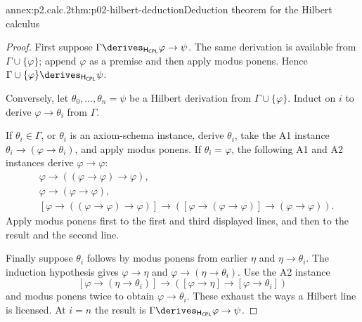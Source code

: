 \begin{annexitem}{annex:p2.calc.2}{thm:p02-hilbert-deduction}{Deduction theorem for the Hilbert calculus}
\begin{proof}
First suppose
\(\Gamma\derives_{\mathsf H_{\mathsf{CPL}}}\varphi\to\psi\).
The same derivation is available from \(\Gamma\cup\{\varphi\}\); append
\(\varphi\) as a premise and then apply modus ponens.  Hence
\(\Gamma\cup\{\varphi\}\derives_{\mathsf H_{\mathsf{CPL}}}\psi\).

Conversely, let \(\theta_0,\ldots,\theta_n=\psi\) be a Hilbert derivation
from \(\Gamma\cup\{\varphi\}\).  Induct on \(i\) to derive
\(\varphi\to\theta_i\) from \(\Gamma\).

If \(\theta_i\in\Gamma\), or \(\theta_i\) is an axiom-schema instance,
derive \(\theta_i\), take the A1 instance
\(\theta_i\to(\varphi\to\theta_i)\), and apply modus ponens.  If
\(\theta_i=\varphi\), the following A1 and A2 instances derive
\(\varphi\to\varphi\):
\[
\begin{aligned}
 &\varphi\to((\varphi\to\varphi)\to\varphi),\\
 &\varphi\to(\varphi\to\varphi),\\
 &[\varphi\to((\varphi\to\varphi)\to\varphi)]
   \to([\varphi\to(\varphi\to\varphi)]
   \to(\varphi\to\varphi)).
\end{aligned}
\]
Apply modus ponens first to the first and third displayed lines, and then to
the result and the second line.

Finally suppose \(\theta_i\) follows by modus ponens from earlier
\(\eta\) and \(\eta\to\theta_i\).  The induction hypothesis gives
\(\varphi\to\eta\) and \(\varphi\to(\eta\to\theta_i)\).  Use the A2
instance
\[
 [\varphi\to(\eta\to\theta_i)]
 \to([\varphi\to\eta]\to[\varphi\to\theta_i])
\]
and modus ponens twice to obtain \(\varphi\to\theta_i\).  These exhaust
the ways a Hilbert line is licensed.  At \(i=n\) the result is
\(\Gamma\derives_{\mathsf H_{\mathsf{CPL}}}\varphi\to\psi\).
\end{proof}
\end{annexitem}

